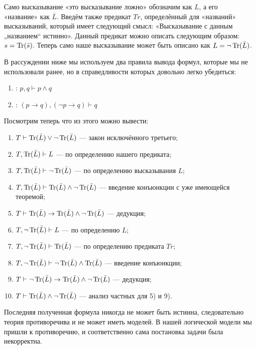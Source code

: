 Само высказывание «это высказывание ложно» обозначим как $L$, а его «название» как $\bar{L}$. Введём также предикат $Tr$, определённый для «названий» высказываний, который имеет следующий смысл: «Высказывание с данным „названием“ истинно». Данный предикат можно описать следующим образом: $s = \operatorname{Tr}(\bar{s})$. Теперь само наше высказывание может быть описано как $L = \neg \operatorname{Tr}(\bar{L})$.

В рассуждении ниже мы используем два правила вывода формул, которые мы не использовали ранее, но в справедливости которых довольно легко убедиться:

\begin{enumerate}
\item {}: $p, q\vdash p\land q$
\item {}: $(p\to q), (\neg p\to q)\vdash q$
\end{enumerate}

Посмотрим теперь что из этого можно вывести:

\begin{enumerate}
\item  $T\vdash \operatorname{Tr}(\bar{L})\vee\neg \operatorname{Tr}(\bar{L})$ — закон исключённого третьего;
\item  $T, \operatorname{Tr}(\bar{L})\vdash L$ — по определению нашего предиката;
\item  $T, \operatorname{Tr}(\bar{L})\vdash \neg \operatorname{Tr}(\bar{L})$ — по определению высказывания $L$;
\item  $T, \operatorname{Tr}(\bar{L})\vdash \operatorname{Tr}(\bar{L})\wedge\neg \operatorname{Tr}(\bar{L})$ — введение конъюнкции с уже имеющейся теоремой;
\item  $T\vdash \operatorname{Tr}(\bar{L})\rightarrow \operatorname{Tr}(\bar{L})\wedge\neg \operatorname{Tr}(\bar{L})$ — дедукция;
\item  $T, \neg \operatorname{Tr}(\bar{L})\vdash L$ — по определению $L$;
\item  $T, \neg \operatorname{Tr}(\bar{L}) \vdash \operatorname{Tr}(\bar{L})$ — по определению предиката $Tr$;
\item  $T, \neg \operatorname{Tr}(\bar{L})\vdash \neg \operatorname{Tr}(\bar{L}) \wedge \operatorname{Tr}(\bar{L})$ — введение конъюнкции;
\item  $T\vdash \neg \operatorname{Tr}(\bar{L})\rightarrow \operatorname{Tr}(\bar{L})\wedge\neg \operatorname{Tr}(\bar{L})$ — дедукция;
\item  $T\vdash \operatorname{Tr}(\bar{L})\wedge\neg \operatorname{Tr}(\bar{L})$ — анализ частных для 5) и 9).
\end{enumerate}

Последняя полученная формула никогда не может быть истинна, следовательно теория противоречива и не может иметь моделей. В нашей логической модели мы пришли к противоречию, и соответственно сама постановка задачи была некорректна.

